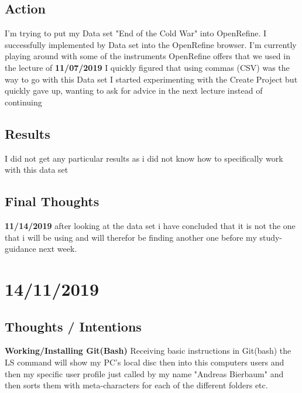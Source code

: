 \documentclass{article}
\begin{document}
\subsection{Action}
I'm trying to put my Data set "End of the Cold War" into OpenRefine. I successfully implemented by Data set into the OpenRefine browser.  I'm currently playing around with some of the instruments OpenRefine offers that we used in the lecture of \textbf{11/07/2019} I quickly figured that using commas (CSV) was the way to go with this Data set
\newline
\newline
 I started experimenting with the Create Project but quickly gave up, wanting to ask for advice in the next lecture instead of continuing 
\subsection{Results}
I did not get any particular results as i did not know how to specifically work with this data set
\subsection{Final Thoughts}
\textbf{11/14/2019} after looking at the data set i have concluded that it is not the one that i will be using and will therefor be finding another one before my study-guidance next week. 

\pagebreak

\section{14/11/2019 }

\subsection{Thoughts / Intentions}
\textbf{Working/Installing Git(Bash)}
\newline
Receiving basic instructions in Git(bash)  the LS command will show my PC's local disc then into this computers  users and then my specific user profile just called by my name "Andreas Bierbaum" and then sorts them with meta-characters for each of the different folders etc. 
\end{document}
